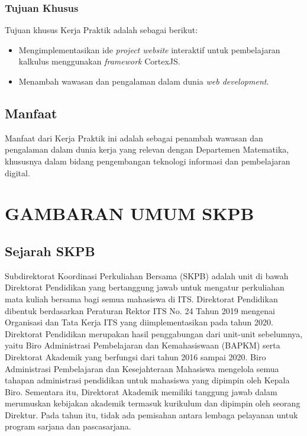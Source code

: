 \documentclass{file/KP-ITS}
\theoremstyle{definition}
\theoremstyle{definition}
\theoremstyle{plain}
\begin{document}
\subsection{Tujuan Khusus}
Tujuan khusus Kerja Praktik adalah sebagai berikut:
\begin{itemize}
    \item Mengimplementasikan ide \textit{project website} interaktif untuk pembelajaran kalkulus menggunakan \textit{framework} CortexJS.
    \item Menambah wawasan dan pengalaman dalam dunia \textit{web development}.
\end{itemize}

\section{Manfaat}
Manfaat dari Kerja Praktik ini adalah sebagai penambah wawasan dan pengalaman dalam dunia kerja yang relevan dengan Departemen Matematika, khususnya dalam bidang pengembangan teknologi informasi dan pembelajaran digital.


\pagebreak
\chapter{GAMBARAN UMUM SKPB}

\section{Sejarah SKPB}
Subdirektorat Koordinasi Perkuliahan Bersama (SKPB) adalah unit di bawah Direktorat Pendidikan yang bertanggung jawab untuk mengatur perkuliahan mata kuliah bersama bagi semua mahasiswa di ITS. Direktorat Pendidikan dibentuk berdasarkan Peraturan Rektor ITS No. 24 Tahun 2019 mengenai Organisasi dan Tata Kerja ITS yang diimplementasikan pada tahun 2020. Direktorat Pendidikan merupakan hasil penggabungan dari unit-unit sebelumnya, yaitu Biro Administrasi Pembelajaran dan Kemahasiswaan (BAPKM) serta Direktorat Akademik yang berfungsi dari tahun 2016 sampai 2020. Biro Administrasi Pembelajaran dan Kesejahteraan Mahasiswa mengelola semua tahapan administrasi pendidikan untuk mahasiswa yang dipimpin oleh Kepala Biro. Sementara itu, Direktorat Akademik memiliki tanggung jawab dalam merumuskan kebijakan akademik termasuk kurikulum dan dipimpin oleh seorang Direktur. Pada tahun itu, tidak ada pemisahan antara lembaga pelayanan untuk program sarjana dan pascasarjana. 
\end{document}
